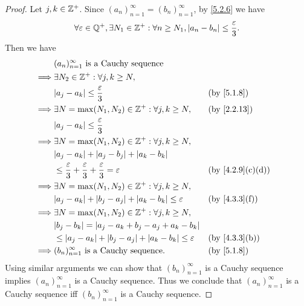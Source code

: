 \begin{proof}
  Let \(j, k \in \mathbb{Z}^+\).
  Since \((a_n)_{n = 1}^\infty = (b_n)_{n = 1}^\infty\), by \cref{5.2.6} we have
  \[
    \forall \varepsilon \in \mathbb{Q}^+, \exists N_1 \in \mathbb{Z}^+ : \forall n \geq N_1, \left\lvert a_n - b_n\right\rvert \leq \dfrac{\varepsilon}{3}.
  \]
  Then we have
  \begin{align*}
             & (a_n)_{n = 1}^\infty \text{ is a Cauchy sequence}                                                                \\
    \implies & \exists N_2 \in \Z^+ : \forall j, k \geq N,                                                                      \\
             & \abs{a_j - a_k} \leq \dfrac{\varepsilon}{3}                                                 &  & \by{5.1.8}      \\
    \implies & \exists N = \max(N_1, N_2) \in \Z^+ : \forall j, k \geq N,                                  &  & \by{2.2.13}     \\
             & \abs{a_j - a_k} \leq \dfrac{\varepsilon}{3}                                                                      \\
    \implies & \exists N = \max(N_1, N_2) \in \Z^+ : \forall j, k \geq N,                                                       \\
             & \abs{a_j - a_k} + \abs{a_j - b_j} + \abs{a_k - b_k}                                                              \\
             & \leq \dfrac{\varepsilon}{3} + \dfrac{\varepsilon}{3} + \dfrac{\varepsilon}{3} = \varepsilon &  & \by{4.2.9}[c,d] \\
    \implies & \exists N = \max(N_1, N_2) \in \Z^+ : \forall j, k \geq N,                                                       \\
             & \abs{a_j - a_k} + \abs{b_j - a_j} + \abs{a_k - b_k} \leq \varepsilon                        &  & \by{4.3.3}[f]   \\
    \implies & \exists N = \max(N_1, N_2) \in \Z^+ : \forall j, k \geq N,                                                       \\
             & \abs{b_j - b_k} = \abs{a_j - a_k + b_j - a_j + a_k - b_k}                                                        \\
             & \leq \abs{a_j - a_k} + \abs{b_j - a_j} + \abs{a_k - b_k} \leq \varepsilon                   &  & \by{4.3.3}[b]   \\
    \implies & (b_n)_{n = 1}^\infty \text{ is a Cauchy sequence}.                                          &  & \by{5.1.8}
  \end{align*}
  Using similar arguments we can show that \((b_n)_{n = 1}^\infty\) is a Cauchy sequence implies \((a_n)_{n = 1}^\infty\) is a Cauchy sequence.
  Thus we conclude that \((a_n)_{n = 1}^\infty\) is a Cauchy sequence iff \((b_n)_{n = 1}^\infty\) is a Cauchy sequence.
\end{proof}

